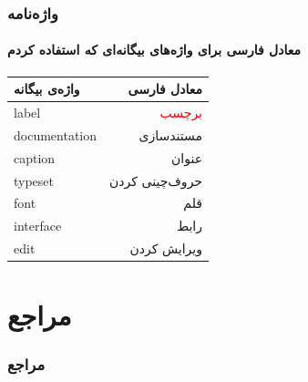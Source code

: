 \documentclass{beamer}
\begin{document}
\begin{frame}[t]
\end{frame}
%
%
\begin{frame}
	\frametitle{واژه‌نامه}
	\framesubtitle{معادل فارسی برای واژه‌های بیگانه‌ای که استفاده کردم}
	\begin{center}
		\scriptsize
		\begin{tabular}{l|r}
			واژه‌ی بیگانه&معادل فارسی\\
			\hline
			label&\textcolor{red}{برچسب}\\
			documentation&مستند‌سازی\\
			caption&عنوان\\
			typeset&حروف‌چینی کردن\\
			font&قلم\\
			interface&رابط\\
			edit&ویرایش کردن\\
		\end{tabular}
	\end{center}
\end{frame}
\section{مراجع}
\begin{frame}
	\frametitle{مراجع}


\end{frame}
%
%
\end{document}
